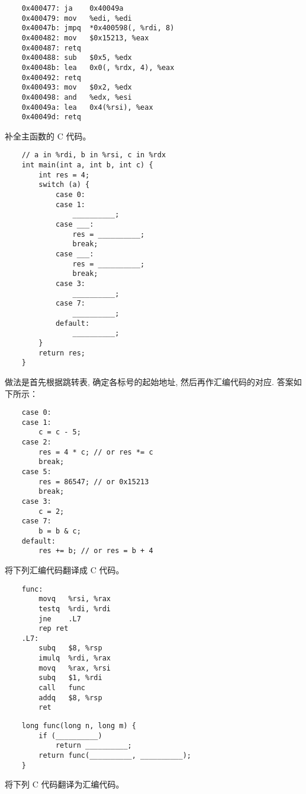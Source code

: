 \begin{problems}
\begin{verbatim}
    0x400477: ja    0x40049a
    0x400479: mov   %edi, %edi
    0x40047b: jmpq  *0x400598(, %rdi, 8)
    0x400482: mov   $0x15213, %eax
    0x400487: retq
    0x400488: sub   $0x5, %edx
    0x40048b: lea   0x0(, %rdx, 4), %eax
    0x400492: retq
    0x400493: mov   $0x2, %edx
    0x400498: and   %edx, %esi
    0x40049a: lea   0x4(%rsi), %eax
    0x40049d: retq             
        \end{verbatim}
        补全主函数的 C 代码。
        \begin{verbatim}
    // a in %rdi, b in %rsi, c in %rdx
    int main(int a, int b, int c) {
        int res = 4;
        switch (a) {
            case 0:
            case 1:
                __________;
            case ___:
                res = __________;
                break;
            case ___:
                res = __________;
                break;
            case 3:
                __________;
            case 7:
                __________;
            default:
                __________;
        }
        return res;
    }
        \end{verbatim}
        \sol 做法是首先根据跳转表, 确定各标号的起始地址, 然后再作汇编代码的对应. 答案如下所示：
        \begin{verbatim}
    case 0:
    case 1:
        c = c - 5;
    case 2:
        res = 4 * c; // or res *= c
        break;
    case 5:
        res = 86547; // or 0x15213
        break;
    case 3:
        c = 2;
    case 7:
        b = b & c;
    default:
        res += b; // or res = b + 4
        \end{verbatim}
        \pro 将下列汇编代码翻译成 C 代码。
        \begin{verbatim}
    func:
        movq   %rsi, %rax
        testq  %rdi, %rdi
        jne    .L7
        rep ret
    .L7:
        subq   $8, %rsp
        imulq  %rdi, %rax
        movq   %rax, %rsi
        subq   $1, %rdi
        call   func
        addq   $8, %rsp
        ret
        \end{verbatim}
        \begin{verbatim}
    long func(long n, long m) {
        if (__________)
            return __________;
        return func(__________, __________);
    }
        \end{verbatim}
        \pro 将下列 C 代码翻译为汇编代码。
        \begin{verbatim}

\end{verbatim}
\end{problems}
